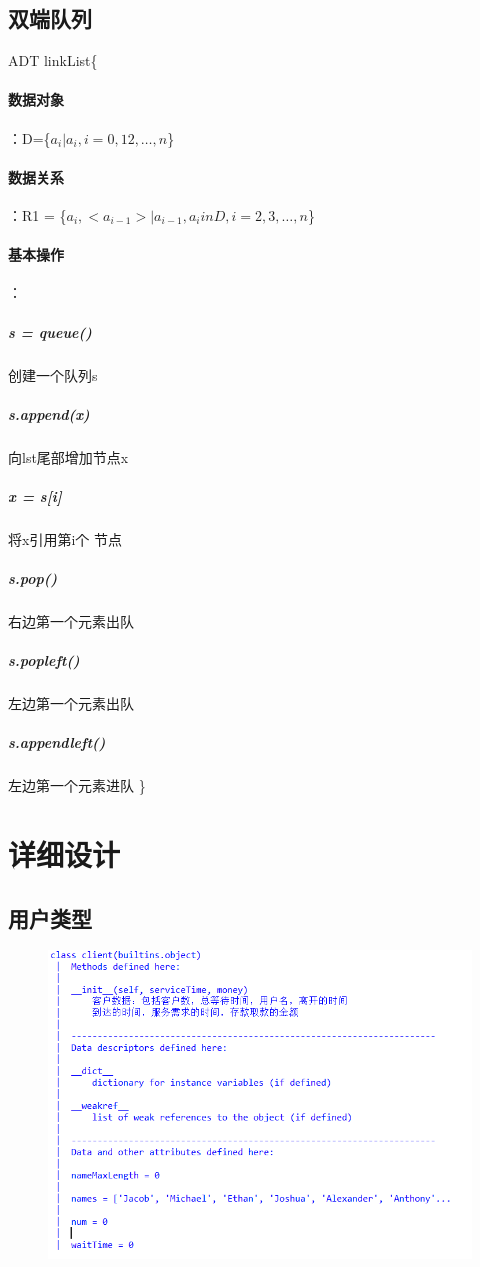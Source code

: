 \documentclass[UTF8]{ctexart}
\begin{document}
\subsection{双端队列}
ADT linkList\{\\
\paragraph{数据对象}：D=\{$a_i| a_i , i =0,1 2,\dots,n$\}\\
\paragraph{数据关系}：R1 = \{$a_i,<a_{i-1}> | a_{i-1},a_i in D ,i = 2,3,\dots,n$\}\\
\paragraph{基本操作}：
\subparagraph{s = queue()}创建一个队列s
\subparagraph{s.append(x)} 向lst尾部增加节点x
\subparagraph{x = s[i]}将x引用第i个 节点
\subparagraph{s.pop()}右边第一个元素出队
\subparagraph{s.popleft()}左边第一个元素出队
\subparagraph{s.appendleft()}左边第一个元素进队
\}
\section{详细设计}
\subsection{用户类型}
\begin{figure}[H]
  \centering
  \includegraphics[width=1\textwidth]{client.png}
\end{figure}
\end{document}
